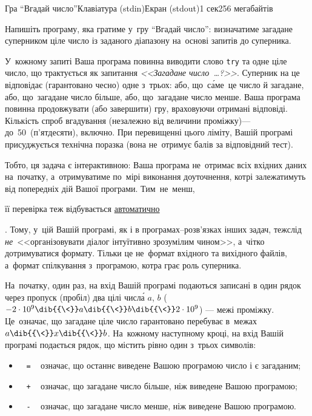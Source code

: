 \begin{problem}{Гра ``Вгадай число''}{Клавіатура (stdin)}{Екран (stdout)}{1 сек}{256 мегабайтів}
\label{prob:201617-oioi-C-guess-number}

Напишіть програму, яка гратиме у~гру ``Вгадай число'': 
визначатиме загадане суперником ціле число із заданого діапазону
на~основі запитів до суперника. 

У~кожному запиті Ваша програма повинна виводити 
слово \texttt{try} та одне ціле число, 
що трактується як запитання \textsl{<<Загадане число~\dots?>>}.
Суперник на це відповідає (гарантовано чесно) одне з~трьох:
або, що~с\'{а}ме~це число й загадане,
або, що~загадане число більше,
або, що~загадане число менше.
Ваша програма повинна продовжувати (або завершити) гру, 
враховуючи отримані відповіді.
Кількість спроб вгадування (незалежно від величини проміжку)\nolinebreak[3] --- 
до~50~(п'ятдесяти), включно.
При перевищенні цього ліміту, Вашій програмі присуджується технічна поразка
(вона не~отримує балів за відповідний тест).

Тобто, ця задача є інтерактивною: 
Ваша програма не~отримає всіх вхідних даних на~початку,
а~отримуватиме по~мірі виконання доуточнення, 
котрі залежатимуть від попередніх дій Вашої програми. 
Тим~не~менш, \begin{slshape}її перевірка теж відбувається 
\underline{автоматично}\end{slshape}. 
Тому, у~цій Вашій програмі, як і в програмах--розв'язках інших задач, 
теж\nolinebreak[3] слід 
\emph{не}~<<організовувати діалог інтуїтивно зрозумілим чином>>,
а~чітко дотримуватися формату. Тільки це не~формат вхідного та вихідного файлів,
а~формат спілкування з~програмою, котра грає роль суперника.

\InputFile
На~початку, один раз, на вхід Вашій програмі подаються 
записані в один рядок через пропуск (пробіл) два цілі числ\'{а} $a$, $b$ 
($-2\cdot10^9\dib{{\<}}a\dib{{\<}}b\dib{{\<}}2\cdot10^9$) --- межі проміжку.
Це~означає, що загадане ціле число гарантовано перебуває в~межах 
$a\dib{{\<}}x\dib{{\<}}b$.
На~кожному наступному кроці, на вхід Вашій програмі подається 
рядок, що містить рівно один з~трьох символів:
\begin{itemize}
\item
~ \verb"=" ~ означає, що останнє виведене Вашою програмою число і є загаданим;
\item
~ \verb"+" ~ означає, що загадане число більше, ніж виведене Вашою програмою;
\item
~ \verb"-" ~ означає, що загадане число менше, ніж виведене Вашою програмою.
\end{itemize}


\end{problem}
